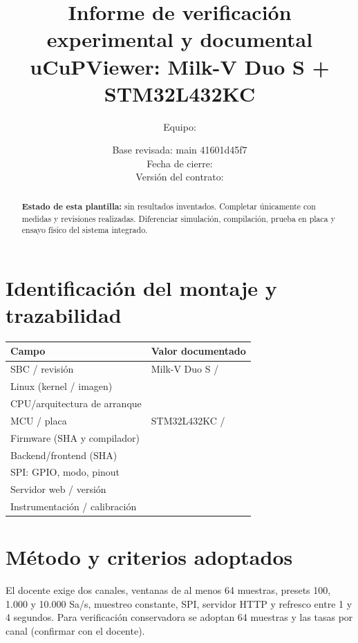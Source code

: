 \documentclass[11pt,a4paper]{article}
\title{\textbf{Informe de verificación experimental y documental}\\\large uCuPViewer: Milk-V Duo S + STM32L432KC}
\author{Equipo: \underline{\hspace{45mm}}}
\date{Base revisada: main 41601d45f7\\ Fecha de cierre: \underline{\hspace{33mm}}\\ Versión del contrato: \underline{\hspace{24mm}}}
\begin{document}
\maketitle
\begin{abstract}
\noindent\textbf{Estado de esta plantilla:} sin resultados inventados. Completar únicamente con medidas y revisiones realizadas. Diferenciar simulación, compilación, prueba en placa y ensayo físico del sistema integrado.
\end{abstract}
\tableofcontents\newpage
\section{Identificación del montaje y trazabilidad}
\begin{longtable}{p{50mm}p{105mm}}\toprule
Campo & Valor documentado\\\midrule
SBC / revisión & Milk-V Duo S / \underline{\hspace{45mm}}\\
Linux (kernel / imagen) & \underline{\hspace{80mm}}\\
CPU/arquitectura de arranque & \underline{\hspace{80mm}}\\
MCU / placa & STM32L432KC / \underline{\hspace{45mm}}\\
Firmware (SHA y compilador) & \underline{\hspace{80mm}}\\
Backend/frontend (SHA) & \underline{\hspace{80mm}}\\
SPI: GPIO, modo, pinout & \underline{\hspace{80mm}}\\
Servidor web / versión & \underline{\hspace{80mm}}\\
Instrumentación / calibración & \underline{\hspace{80mm}}\\
\bottomrule\end{longtable}

\section{Método y criterios adoptados}
El docente exige dos canales, ventanas de al menos 64 muestras, presets 100, 1.000 y 10.000 Sa/s, muestreo constante, SPI, servidor HTTP y refresco entre 1 y 4 segundos. Para verificación conservadora se adoptan 64 muestras y las tasas por canal (confirmar con el docente).
\end{document}
